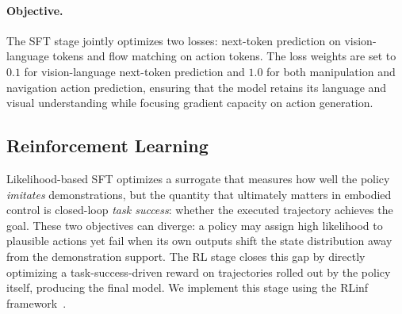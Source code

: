 \documentclass{article}
\begin{document}
\paragraph{Objective.}
The SFT stage jointly optimizes two losses: next-token prediction on vision-language tokens and flow matching on action tokens. The loss weights are set to $0.1$ for vision-language next-token prediction and $1.0$ for both manipulation and navigation action prediction, ensuring that the model retains its language and visual understanding while focusing gradient capacity on action generation.


\subsection{Reinforcement Learning}
\label{sec:rl}

Likelihood-based SFT optimizes a surrogate that measures how well the policy \emph{imitates} demonstrations, but the quantity that ultimately matters in embodied control is closed-loop \emph{task success}: whether the executed trajectory achieves the goal.
These two objectives can diverge: a policy may assign high likelihood to plausible actions yet fail when its own outputs shift the state distribution away from the demonstration support.
The RL stage closes this gap by directly optimizing a task-success-driven reward on trajectories rolled out by the policy itself, producing the final model. We implement this stage using the RLinf framework~\citep{yu2025rlinf}.
\end{document}
